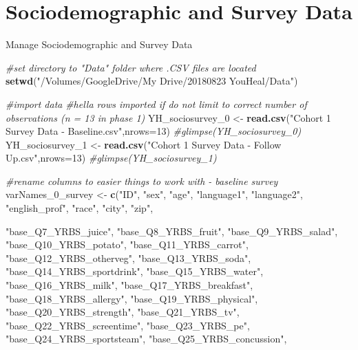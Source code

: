 \documentclass[]{article}
\newenvironment{Shaded}{\begin{snugshade}}{\end{snugshade}}
\newcommand{\KeywordTok}[1]{\textcolor[rgb]{0.13,0.29,0.53}{\textbf{#1}}}
\newcommand{\DataTypeTok}[1]{\textcolor[rgb]{0.13,0.29,0.53}{#1}}
\newcommand{\DecValTok}[1]{\textcolor[rgb]{0.00,0.00,0.81}{#1}}
\newcommand{\StringTok}[1]{\textcolor[rgb]{0.31,0.60,0.02}{#1}}
\newcommand{\CommentTok}[1]{\textcolor[rgb]{0.56,0.35,0.01}{\textit{#1}}}
\newcommand{\NormalTok}[1]{#1}
\begin{document}
\section{Sociodemographic and Survey
Data}\label{sociodemographic-and-survey-data}

Manage Sociodemographic and Survey Data

\begin{Shaded}
\begin{Highlighting}[]
\CommentTok{#set directory to "Data" folder where .CSV files are located}
\KeywordTok{setwd}\NormalTok{(}\StringTok{"/Volumes/GoogleDrive/My Drive/20180823 YouHeal/Data"}\NormalTok{)}

\CommentTok{#import data}
\CommentTok{#hella rows imported if do not limit to correct number of observations (n = 13 in phase 1)}
\NormalTok{YH_sociosurvey_}\DecValTok{0}\NormalTok{ <-}\StringTok{ }\KeywordTok{read.csv}\NormalTok{(}\StringTok{"Cohort 1 Survey Data - Baseline.csv"}\NormalTok{,}\DataTypeTok{nrows=}\DecValTok{13}\NormalTok{)}
\CommentTok{#glimpse(YH_sociosurvey_0)}
\NormalTok{YH_sociosurvey_}\DecValTok{1}\NormalTok{ <-}\StringTok{ }\KeywordTok{read.csv}\NormalTok{(}\StringTok{"Cohort 1 Survey Data - Follow Up.csv"}\NormalTok{,}\DataTypeTok{nrows=}\DecValTok{13}\NormalTok{)}
\CommentTok{#glimpse(YH_sociosurvey_1)}

\CommentTok{#rename columns to easier things to work with - baseline survey}
\NormalTok{varNames_0_survey <-}\StringTok{ }\KeywordTok{c}\NormalTok{(}\StringTok{"ID"}\NormalTok{, }
 \StringTok{"sex"}\NormalTok{, }\StringTok{"age"}\NormalTok{, }\StringTok{"language1"}\NormalTok{, }\StringTok{"language2"}\NormalTok{, }\StringTok{"english_prof"}\NormalTok{, }\StringTok{"race"}\NormalTok{, }\StringTok{"city"}\NormalTok{, }\StringTok{"zip"}\NormalTok{,}
 
 \StringTok{"base_Q7_YRBS_juice"}\NormalTok{, }\StringTok{"base_Q8_YRBS_fruit"}\NormalTok{, }\StringTok{"base_Q9_YRBS_salad"}\NormalTok{,}
 \StringTok{"base_Q10_YRBS_potato"}\NormalTok{, }\StringTok{"base_Q11_YRBS_carrot"}\NormalTok{, }\StringTok{"base_Q12_YRBS_otherveg"}\NormalTok{, }
 \StringTok{"base_Q13_YRBS_soda"}\NormalTok{, }\StringTok{"base_Q14_YRBS_sportdrink"}\NormalTok{, }\StringTok{"base_Q15_YRBS_water"}\NormalTok{, }
 \StringTok{"base_Q16_YRBS_milk"}\NormalTok{, }\StringTok{"base_Q17_YRBS_breakfast"}\NormalTok{, }\StringTok{"base_Q18_YRBS_allergy"}\NormalTok{,}
 \StringTok{"base_Q19_YRBS_physical"}\NormalTok{, }\StringTok{"base_Q20_YRBS_strength"}\NormalTok{, }\StringTok{"base_Q21_YRBS_tv"}\NormalTok{,}
 \StringTok{"base_Q22_YRBS_screentime"}\NormalTok{, }\StringTok{"base_Q23_YRBS_pe"}\NormalTok{, }\StringTok{"base_Q24_YRBS_sportsteam"}\NormalTok{, }
 \StringTok{"base_Q25_YRBS_concussion"}\NormalTok{, }
 

\end{Highlighting}
\end{Shaded}
\end{document}

